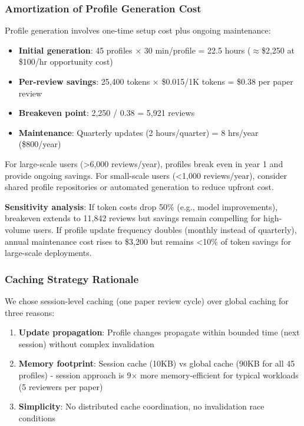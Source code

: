 \label{sec:discussion-caching}

\subsubsection{Amortization of Profile Generation Cost}

Profile generation involves one-time setup cost plus ongoing maintenance:

\begin{itemize}
\item \textbf{Initial generation}: 45 profiles × 30 min/profile = 22.5 hours ($\approx$\$2,250 at \$100/hr opportunity cost)
\item \textbf{Per-review savings}: 25,400 tokens × \$0.015/1K tokens = \$0.38 per paper review
\item \textbf{Breakeven point}: 2,250 / 0.38 = 5,921 reviews
\item \textbf{Maintenance}: Quarterly updates (2 hours/quarter) = 8 hrs/year (\$800/year)
\end{itemize}

For large-scale users (>6,000 reviews/year), profiles break even in year 1 and provide ongoing savings. For small-scale users (<1,000 reviews/year), consider shared profile repositories or automated generation to reduce upfront cost.

\textbf{Sensitivity analysis}: If token costs drop 50\% (e.g., model improvements), breakeven extends to 11,842 reviews but savings remain compelling for high-volume users. If profile update frequency doubles (monthly instead of quarterly), annual maintenance cost rises to \$3,200 but remains <10\% of token savings for large-scale deployments.

\subsubsection{Caching Strategy Rationale}

We chose session-level caching (one paper review cycle) over global caching for three reasons:

\begin{enumerate}
\item \textbf{Update propagation}: Profile changes propagate within bounded time (next session) without complex invalidation
\item \textbf{Memory footprint}: Session cache (10KB) vs global cache (90KB for all 45 profiles) - session approach is 9× more memory-efficient for typical workloads (5 reviewers per paper)
\item \textbf{Simplicity}: No distributed cache coordination, no invalidation race conditions
\end{enumerate}

